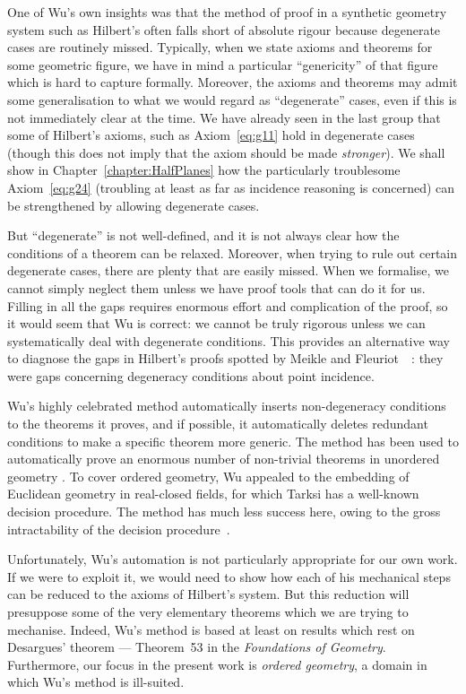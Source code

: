 One of Wu's own insights was that the method of proof in a synthetic geometry system such as Hilbert's often falls short of absolute rigour because degenerate cases are routinely missed. Typically, when we state axioms and theorems for some geometric figure, we have in mind a particular ``genericity'' of that figure which is hard to capture formally. Moreover, the axioms and theorems may admit some generalisation to what we would regard as ``degenerate'' cases, even if this is not immediately clear at the time. We have already seen in the last group that some of Hilbert's axioms, such as Axiom~\ref{eq:g11} hold in degenerate cases (though this does not imply that the axiom should be made \emph{stronger}). We shall show in Chapter~\ref{chapter:HalfPlanes} how the particularly troublesome Axiom~\ref{eq:g24} (troubling at least as far as incidence reasoning is concerned) can be strengthened by allowing degenerate cases.

But ``degenerate'' is not well-defined, and it is not always clear how the conditions of a theorem can be relaxed. Moreover, when trying to rule out certain degenerate cases, there are plenty that are easily missed. When we formalise, we cannot simply neglect them unless we have proof tools that can do it for us. Filling in all the gaps requires enormous effort and complication of the proof, so it would seem that Wu is correct: we cannot be truly rigorous unless we can systematically deal with degenerate conditions. This provides an alternative way to diagnose the gaps in Hilbert's proofs spotted by Meikle and Fleuriot~~\cite{MeikleFleuriotFormalizingHilbert}: they were gaps concerning degeneracy conditions about point incidence.

Wu's highly celebrated method automatically inserts non-degeneracy conditions to the theorems it proves, and if possible, it automatically deletes redundant conditions to make a specific theorem more generic. The method has been used to automatically prove an enormous number of non-trivial theorems in unordered geometry \cite{MechanicalGeometryTheoremProving}. To cover ordered geometry, Wu appealed to the embedding of Euclidean geometry in real-closed fields, for which Tarksi has a well-known decision procedure. The method has much less success here, owing to the gross intractability of the decision procedure~\cite{TarksiMcNaugtonReview}. 

Unfortunately, Wu's automation is not particularly appropriate for our own work. If we were to exploit it, we would need to show how each of his mechanical steps can be reduced to the axioms of Hilbert's system. But this reduction will presuppose some of the very elementary theorems which we are trying to mechanise. Indeed, Wu's method is based at least on results which rest on Desargues' theorem --- Theorem~53 in the \emph{Foundations of Geometry}. Furthermore, our focus in the present work is \emph{ordered geometry}, a domain in which Wu's method is ill-suited. 


